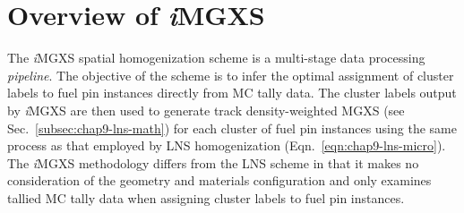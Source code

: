 %
%


\section{Overview of \textit{i}MGXS}
\label{sec:chap10-overview}

The \textit{i}\ac{MGXS} spatial homogenization scheme is a multi-stage data processing \textit{pipeline}. The objective of the scheme is to infer the optimal assignment of cluster labels to fuel pin instances directly from \ac{MC} tally data. The cluster labels output by \textit{i}\ac{MGXS} are then used to generate track density-weighted \ac{MGXS} (see Sec.~\ref{subsec:chap9-lns-math}) for each cluster of fuel pin instances using the same process as that employed by \ac{LNS} homogenization (Eqn.~\ref{eqn:chap9-lns-micro}). The \textit{i}\ac{MGXS} methodology differs from the \ac{LNS} scheme in that it makes no consideration of the geometry and materials configuration and only examines tallied \ac{MC} tally data when assigning cluster labels to fuel pin instances.

